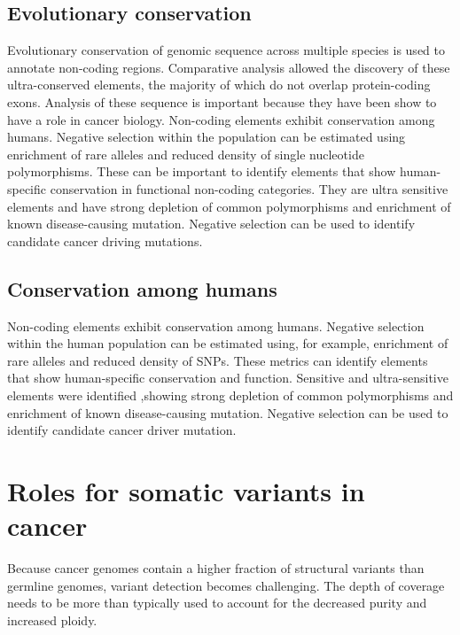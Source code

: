 	\subsection{Evolutionary conservation}
	Evolutionary conservation of genomic sequence across multiple species is used to annotate non-coding regions.
	Comparative analysis allowed the discovery of these ultra-conserved elements, the majority of which do not overlap protein-coding exons.
	Analysis of these sequence is important because they have been show to have a role in cancer biology.
	Non-coding elements exhibit conservation among humans.
	Negative selection within the population can be estimated using enrichment of rare alleles and reduced density of single nucleotide polymorphisms.
	These can be important to identify elements that show human-specific conservation in functional non-coding categories.
	They are ultra sensitive elements and have strong depletion of common polymorphisms and enrichment of known disease-causing mutation.
	Negative selection can be used to identify candidate cancer driving mutations.

	\subsection{Conservation among humans}
	Non-coding elements exhibit conservation among humans.
	Negative selection within the human population can be estimated using, for example, enrichment of rare alleles and reduced density of SNPs.
	These metrics can identify elements that show human-specific conservation and function.
	Sensitive and ultra-sensitive elements were identified ,showing strong depletion of common polymorphisms and enrichment of known disease-causing mutation.
	Negative selection can be used to identify candidate cancer driver mutation.

\section{Roles for somatic variants in cancer}
Because cancer genomes contain a higher fraction of structural variants than germline genomes, variant detection becomes challenging.
The depth of coverage needs to be more than typically used to account for the decreased purity and increased ploidy.

